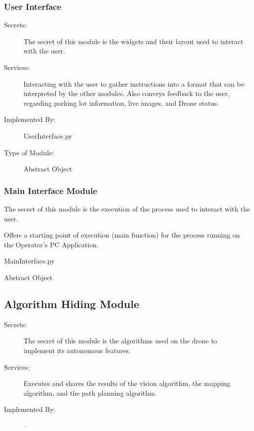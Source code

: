 \documentclass[12pt, titlepage]{article}
\begin{document}
\subsubsection{User Interface}
\label{User Interface}
\begin{description}
\item[Secrets:] The secret of this module is the widgets and their layout used to interact with the user. 
\item[Services:] Interacting with the user to gather instructions into a format that can be interpreted by the other modules. Also conveys feedback to the user, regarding parking lot information, live images, and Drone status.
\item[Implemented By:] UserInterface.py
\item[Type of Module:] Abstract Object
\end{description}
\subsubsection{Main Interface Module}
\begin{description}
\label{Main Interface Module}
\item[Secrets:] The secret of this module is the execution of the process used to interact with the user.
\item[Services:] Offers a starting point of execution (main function) for the process running on the Operator's PC Application. 
\item[Implemented By:] MainInterface.py
\item[Type of Module:] Abstract Object
\end{description}

\subsection{Algorithm Hiding Module}
\begin{description}
\item[Secrets:] The secret of this module is the algorithms used on the drone to implement its autonomous features.
\item[Services:] Executes and shares the results of the vision algorithm, the mapping algorithm, and the path planning algorithm.
\item[Implemented By:] --
\end{description}
\end{document}
